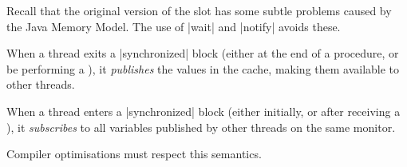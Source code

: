 








\begin{slide}

Recall that the original version of the slot has some  subtle problems caused
by the Java Memory Model.  The use of |wait| and |notify| avoids
these. 

When a thread exits a |synchronized| block (either at the end of a
procedure, or be performing a ), it \emph{publishes} the
values in the cache, making them available to other threads.

When a thread enters a |synchronized| block (either initially, or after
receiving a ), it \emph{subscribes} to all variables
published by other threads on the same monitor.

Compiler optimisations must respect this
semantics.

\vfill
\end{slide}



